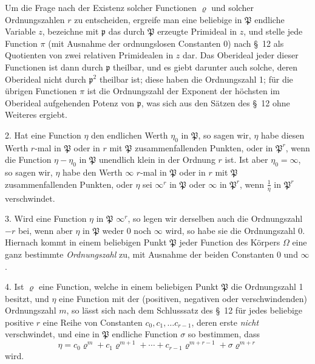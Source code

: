 \documentclass{article}
\begin{document}
Um die Frage nach der Existenz solcher Functionen $\varrho$ und solcher Ordnungszahlen $r$ zu entscheiden, ergreife man eine beliebige in $\mathfrak{P}$ endliche Variable $z$, bezeichne mit $\mathfrak{p}$ das durch $\mathfrak{P}$ erzeugte Primideal in $z$, und stelle jede Function $\pi$ (mit Ausnahme der ordnungslosen Constanten 0) nach §~12 als Quotienten von zwei relativen Primidealen in $z$ dar. Das Oberideal jeder dieser Functionen ist dann durch $\mathfrak{p}$ theilbar, und es giebt darunter auch solche, deren Oberideal nicht durch $\mathfrak{p}^{2}$ theilbar ist; diese haben die Ordnungszahl 1; für die übrigen Functionen $\pi$ ist die Ordnungszahl der Exponent der höchsten im Oberideal aufgehenden Potenz von $\mathfrak{p}$, was sich aus den Sätzen des §~12 ohne Weiteres ergiebt.

2. Hat eine Function $\eta$ den endlichen Werth $\eta_{0}$ in $\mathfrak{P}$, so sagen wir, $\eta$ habe diesen Werth $r$-mal in $\mathfrak{P}$ oder in $r$ mit $\mathfrak{P}$ zusammenfallenden Punkten, oder in $\mathfrak{P}^{r}$, wenn die Function $\eta - \eta_{0}$ in $\mathfrak{P}$ unendlich klein in der Ordnung $r$ ist. Ist aber $\eta_{0} = \infty$, so sagen wir, $\eta$ habe den Werth $\infty$ $r$-mal in $\mathfrak{P}$ oder in $r$ mit $\mathfrak{P}$ zusammenfallenden Punkten, oder $\eta$ sei $\infty^{r}$ in $\mathfrak{P}$ oder $\infty$ in $\mathfrak{P}^{r}$, wenn $\frac{1}{\eta}$ in $\mathfrak{P}^{r}$ verschwindet.

3. Wird eine Function $\eta$ in $\mathfrak{P}$ $\infty^{r}$, so legen wir derselben auch die Ordnungszahl $-r$ bei, wenn aber $\eta$ in $\mathfrak{P}$ weder 0 noch $\infty$ wird, so habe sie die Ordnungszahl 0. Hiernach kommt in einem beliebigen Punkt $\mathfrak{P}$ jeder Function des Körpers $\Omega$ eine ganz bestimmte \emph{Ordnungszahl} zu, mit Ausnahme der beiden Constanten 0 und $\infty$.

4. Ist $\varrho$ eine Function, welche in einem beliebigen Punkt $\mathfrak{P}$ die Ordnungszahl 1 besitzt, und $\eta$ eine Function mit der (positiven, negativen oder verschwindenden) Ordnungszahl $m$, so lässt sich nach dem Schlusssatz des §~12 für jedes beliebige positive $r$ eine Reihe von Constanten $c_{0}, c_{1}, \ldots c_{r-1}$, deren erste \emph{nicht} verschwindet, und eine in $\mathfrak{P}$ endliche Function $\sigma$ so bestimmen, dass
\[ \eta = c_{0}\varrho^{m} + c_{1}\varrho^{m+1} + \cdots + c_{r-1}\varrho^{m+r-1} + \sigma\varrho^{m+r} \]
wird.

\end{document}
